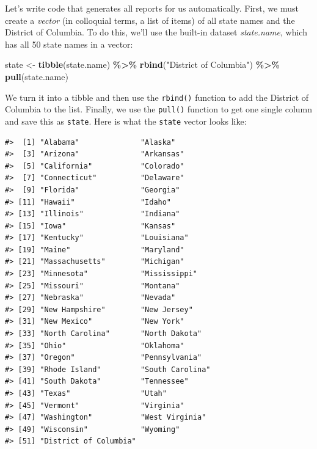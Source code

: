 \documentclass[
]{book}
\newenvironment{Shaded}{\begin{snugshade}}{\end{snugshade}}
\newcommand{\FunctionTok}[1]{\textcolor[rgb]{0.13,0.29,0.53}{\textbf{#1}}}
\newcommand{\NormalTok}[1]{#1}
\newcommand{\OtherTok}[1]{\textcolor[rgb]{0.56,0.35,0.01}{#1}}
\newcommand{\SpecialCharTok}[1]{\textcolor[rgb]{0.81,0.36,0.00}{\textbf{#1}}}
\newcommand{\StringTok}[1]{\textcolor[rgb]{0.31,0.60,0.02}{#1}}
\begin{document}
Let's write code that generates all reports for us automatically. First, we must create a \emph{vector} (in colloquial terms, a list of items) of all state names and the District of Columbia. To do this, we'll use the built-in dataset \emph{state.name}, which has all 50 state names in a vector:

\begin{Shaded}
\begin{Highlighting}[]
\NormalTok{state }\OtherTok{\textless{}{-}} \FunctionTok{tibble}\NormalTok{(state.name) }\SpecialCharTok{\%\textgreater{}\%}
  \FunctionTok{rbind}\NormalTok{(}\StringTok{"District of Columbia"}\NormalTok{) }\SpecialCharTok{\%\textgreater{}\%}
  \FunctionTok{pull}\NormalTok{(state.name)}
\end{Highlighting}
\end{Shaded}

We turn it into a tibble and then use the \texttt{rbind()} function to add the District of Columbia to the list. Finally, we use the \texttt{pull()} function to get one single column and save this as \texttt{state}. Here is what the \texttt{state} vector looks like:

\begin{verbatim}
#>  [1] "Alabama"              "Alaska"              
#>  [3] "Arizona"              "Arkansas"            
#>  [5] "California"           "Colorado"            
#>  [7] "Connecticut"          "Delaware"            
#>  [9] "Florida"              "Georgia"             
#> [11] "Hawaii"               "Idaho"               
#> [13] "Illinois"             "Indiana"             
#> [15] "Iowa"                 "Kansas"              
#> [17] "Kentucky"             "Louisiana"           
#> [19] "Maine"                "Maryland"            
#> [21] "Massachusetts"        "Michigan"            
#> [23] "Minnesota"            "Mississippi"         
#> [25] "Missouri"             "Montana"             
#> [27] "Nebraska"             "Nevada"              
#> [29] "New Hampshire"        "New Jersey"          
#> [31] "New Mexico"           "New York"            
#> [33] "North Carolina"       "North Dakota"        
#> [35] "Ohio"                 "Oklahoma"            
#> [37] "Oregon"               "Pennsylvania"        
#> [39] "Rhode Island"         "South Carolina"      
#> [41] "South Dakota"         "Tennessee"           
#> [43] "Texas"                "Utah"                
#> [45] "Vermont"              "Virginia"            
#> [47] "Washington"           "West Virginia"       
#> [49] "Wisconsin"            "Wyoming"             
#> [51] "District of Columbia"
\end{verbatim}
\end{document}
